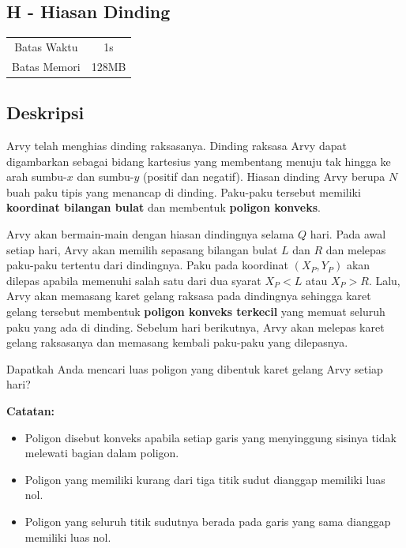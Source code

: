 \documentclass{article}
\begin{document}
\begin{center}
    \section*{H - Hiasan Dinding} %

    \begin{tabular}{ | c c | }
        \hline
        Batas Waktu  & 1s \\    %
        Batas Memori & 128MB \\  %
        \hline
    \end{tabular}
\end{center}

\subsection*{Deskripsi}

Arvy telah menghias dinding raksasanya. Dinding raksasa Arvy dapat digambarkan sebagai bidang kartesius yang membentang menuju tak hingga ke arah sumbu-$x$ dan sumbu-$y$ (positif dan negatif). Hiasan dinding Arvy berupa $N$ buah paku tipis yang menancap di dinding. Paku-paku tersebut memiliki \textbf{koordinat bilangan bulat} dan membentuk \textbf{poligon konveks}.

Arvy akan bermain-main dengan hiasan dindingnya selama $Q$ hari. Pada awal setiap hari, Arvy akan memilih sepasang bilangan bulat $L$ dan $R$ dan melepas paku-paku tertentu dari dindingnya. Paku pada koordinat $(X_P,Y_P)$ akan dilepas apabila memenuhi salah satu dari dua syarat $X_P < L$ atau $X_P > R$. Lalu, Arvy akan memasang karet gelang raksasa pada dindingnya sehingga karet gelang tersebut membentuk \textbf{poligon konveks terkecil} yang memuat seluruh paku yang ada di dinding. Sebelum hari berikutnya, Arvy akan melepas karet gelang raksasanya dan memasang kembali paku-paku yang dilepasnya.

Dapatkah Anda mencari luas poligon yang dibentuk karet gelang Arvy setiap hari?

\textbf{Catatan:} 
\begin{itemize}
    \setlength\itemsep{0pt}
    \item{Poligon disebut konveks apabila setiap garis yang menyinggung sisinya tidak melewati bagian dalam poligon.}
    \item{Poligon yang memiliki kurang dari tiga titik sudut dianggap memiliki luas nol.}
    \item{Poligon yang seluruh titik sudutnya berada pada garis yang sama dianggap memiliki luas nol.}
\end{itemize}
\end{document}
